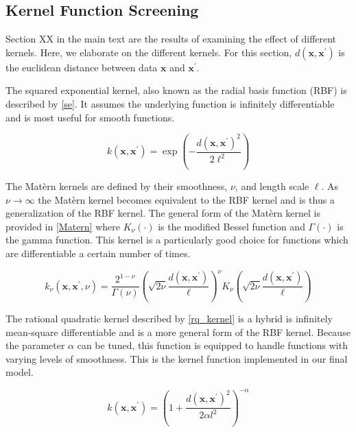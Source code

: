 \documentclass[journal=jacsat,manuscript=article]{achemso}
\begin{document}
\subsection{Kernel Function Screening}

Section XX in the main text are the results of examining the effect of different kernels. Here, we elaborate on the different kernels. For this section, $d(\mathbf{x}, \mathbf{x}^{\prime})$ is the euclidean distance between data $\mathbf{x}$ and $\mathbf{x}^{\prime}$.

The squared exponential kernel, also known as the radial basis function (RBF) is described by \eqref{se}. It assumes the underlying function is infinitely differentiable and is most useful for smooth functions.

\begin{equation}
    k(\mathbf{x}, \mathbf{x}^{\prime}) = \exp\left(-\frac{d(\mathbf{x}, \mathbf{x}^{\prime})^2}{2\ell^2} \right)
    \label{se}
\end{equation}

The Mat\`ern kernels are defined by their smoothness, $\nu$, and length scale $\ell$. As $\nu \rightarrow \infty$ the Mat\`ern kernel becomes equivalent to the RBF kernel and is thus a generalization of the RBF kernel. The general form of the Mat\`ern kernel is provided in \eqref{Matern} where $K_\nu(\cdot)$ is the modified Bessel function and $\Gamma(\cdot)$ is the gamma function. This kernel is a particularly good choice for functions which are differentiable a certain number of times.

\begin{equation}
    k_\nu(\mathbf{x}, \mathbf{x}^{\prime}, \nu) = \frac{2^{1-\nu}}{\Gamma(\nu)} \left( \sqrt{2\nu} \frac{d(\mathbf{x}, \mathbf{x}^{\prime})}{\ell} \right)^\nu K_\nu \left( \sqrt{2\nu} \frac{d(\mathbf{x}, \mathbf{x}^{\prime})}{\ell} \right)
    \label{Matern}
\end{equation}

The rational quadratic kernel described by \eqref{rq_kernel} is a hybrid is infinitely mean-square differentiable \cite{Gramacy2020Surrogates:Sciences} and is a more general form of the RBF kernel. Because the parameter $\alpha$ can be tuned, this function is equipped to handle functions with varying levels of smoothness. This is the kernel function implemented in our final model.

\begin{equation}
    k(\mathbf{x}, \mathbf{x}^{\prime}) = \left(1 + \frac{d(\mathbf{x}, \mathbf{x}^{\prime})^2}{2\alpha l^2}\right)^{-\alpha}
    \label{rq_kernel}
\end{equation}
\end{document}
